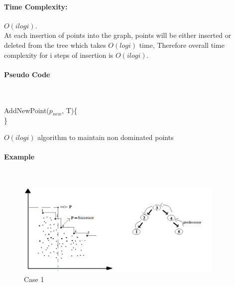 \documentclass[pdftex,a4paper,12pt]{report}
\begin{document}
\paragraph{Time Complexity:} \textbf{$O(i logi)$}.\\
At each insertion of points into the graph, points will be either inserted or deleted from the tree which takes \textbf{$O(logi)$} time,
Therefore overall time complexity for i steps of insertion is \textbf{$O(i logi)$}.

\newpage
\paragraph{Pseudo Code}\makebox[2pt]{}\\
\begin{algorithm}
AddNewPoint($p_{new}$, T)\{\\
\}
\caption{\textbf{$O(i logi)$} algorithm to maintain non dominated points}
\label{algo}
\end{algorithm}
\newpage
\paragraph{Example} \makebox[2pt]{}\\
\begin{figure}[ht!]
\centering
\includegraphics[width=100mm]{p11.png}
\caption{Case 1}
\label{fig1}
\end{figure}
\end{document}
